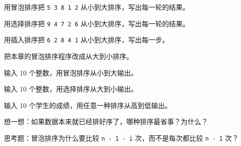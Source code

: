 \begin{problemset}
  \item 用冒泡排序把 \texttt{5 3 8 1 2} 从小到大排序，写出每一轮的结果。
  \item 用选择排序把 \texttt{9 4 7 2 6} 从小到大排序，写出每一轮的结果。
  \item 用插入排序把 \texttt{6 2 8 4 1} 从小到大排序，写出每一步。
  \item 把本章的冒泡排序程序改成从大到小排序。
  \item 输入 10 个整数，用冒泡排序从小到大输出。
  \item 输入 10 个整数，用选择排序从大到小输出。
  \item 输入 10 个学生的成绩，用任意一种排序从高到低输出。
  \item 想一想：如果数据本来就已经排好序了，哪种排序最省事？为什么？
  \item 思考题：冒泡排序为什么要比较 \texttt{n - 1 - i} 次，而不是每次都比较 \texttt{n - 1} 次？
\end{problemset}
